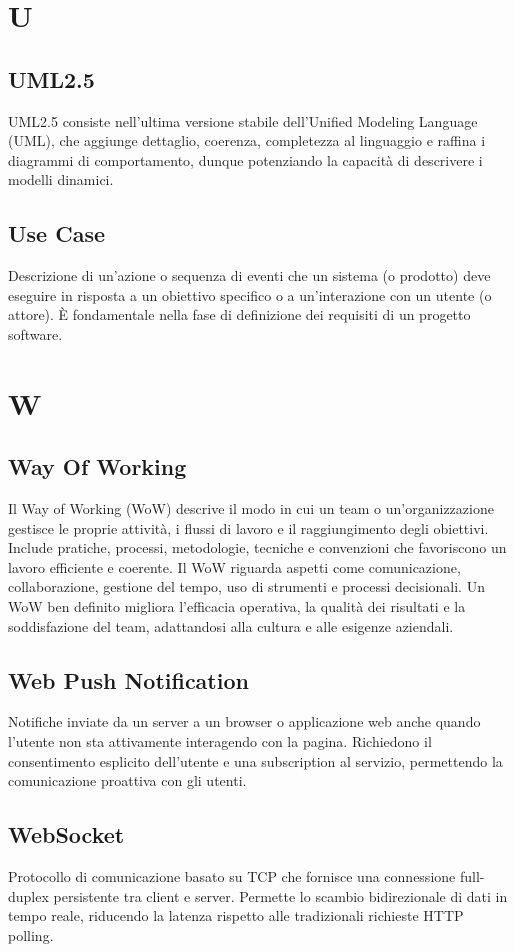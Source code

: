 \documentclass[10pt, letterpaper]{article}
\begin{document}
\section{U}

\subsection*{UML2.5}
UML2.5 consiste nell'ultima versione stabile dell'Unified Modeling Language (UML), che aggiunge dettaglio, coerenza, completezza al linguaggio e raffina i
diagrammi di comportamento, dunque potenziando la capacità di descrivere i modelli dinamici.

\subsection*{Use Case}
Descrizione di un'azione o sequenza di eventi che un sistema (o prodotto) deve eseguire in risposta a un obiettivo specifico o a un'interazione con un utente
(o attore). È fondamentale nella fase di definizione dei requisiti di un progetto software.

\section{W}

\subsection*{Way Of Working}
Il Way of Working (WoW) descrive il modo in cui un team o un'organizzazione gestisce le proprie attività, i flussi di lavoro e il raggiungimento degli obiettivi.
Include pratiche, processi, metodologie, tecniche e convenzioni che favoriscono un lavoro efficiente e coerente. Il WoW riguarda aspetti come comunicazione,
collaborazione, gestione del tempo, uso di strumenti e processi decisionali. Un WoW ben definito migliora l'efficacia operativa, la qualità dei risultati e la
soddisfazione del team, adattandosi alla cultura e alle esigenze aziendali.

\subsection*{Web Push Notification}
Notifiche inviate da un server a un browser o applicazione web anche quando l'utente non sta attivamente interagendo con la pagina.
Richiedono il consentimento esplicito dell'utente e una subscription al servizio, permettendo la comunicazione proattiva con gli utenti.

\subsection*{WebSocket}
Protocollo di comunicazione basato su TCP che fornisce una connessione full-duplex persistente tra client e server.
Permette lo scambio bidirezionale di dati in tempo reale, riducendo la latenza rispetto alle tradizionali richieste HTTP polling.
\end{document}
